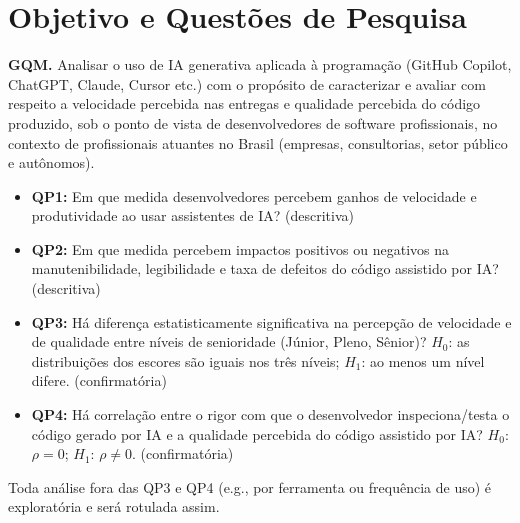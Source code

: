 \section{Objetivo e Questões de Pesquisa}

\textbf{GQM.} Analisar o uso de IA generativa aplicada à programação (GitHub Copilot, ChatGPT, Claude, Cursor etc.) com o propósito de caracterizar e avaliar com respeito a velocidade percebida nas entregas e qualidade percebida do código produzido, sob o ponto de vista de desenvolvedores de software profissionais, no contexto de profissionais atuantes no Brasil (empresas, consultorias, setor público e autônomos).

\begin{itemize}
  \item \textbf{QP1:} Em que medida desenvolvedores percebem ganhos de velocidade e produtividade ao usar assistentes de IA? (descritiva)
  \item \textbf{QP2:} Em que medida percebem impactos positivos ou negativos na manutenibilidade, legibilidade e taxa de defeitos do código assistido por IA? (descritiva)
  \item \textbf{QP3:} Há diferença estatisticamente significativa na percepção de velocidade e de qualidade entre níveis de senioridade (Júnior, Pleno, Sênior)? $H_0$: as distribuições dos escores são iguais nos três níveis; $H_1$: ao menos um nível difere. (confirmatória)
  \item \textbf{QP4:} Há correlação entre o rigor com que o desenvolvedor inspeciona/testa o código gerado por IA e a qualidade percebida do código assistido por IA? $H_0$: $\rho = 0$; $H_1$: $\rho \neq 0$. (confirmatória)
\end{itemize}

Toda análise fora das QP3 e QP4 (e.g., por ferramenta ou frequência de uso) é exploratória e será rotulada assim.
